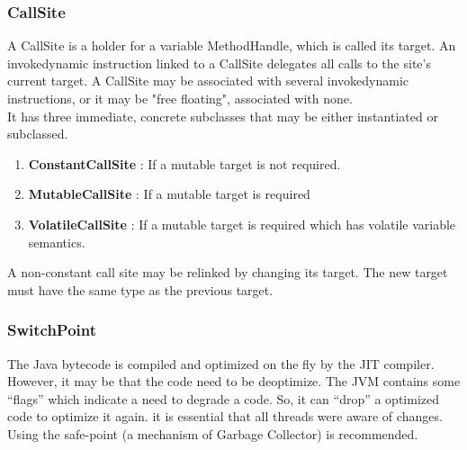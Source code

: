 \documentclass{sigplanconf}
\def \JVM{JVM\xspace}
\begin{document}
      \subsubsection{CallSite}
        A CallSite is a holder for a variable MethodHandle, which is called its target.
        An invokedynamic instruction linked to a CallSite delegates all calls to the site's current target.
        A CallSite may be associated with several invokedynamic instructions,
        or it may be "free floating", associated with none.\\

        It has three immediate, concrete subclasses that may be either instantiated or subclassed.
        \begin{enumerate}
          \item \textbf{ConstantCallSite} : If a mutable target is not required.
          \item \textbf{MutableCallSite}  : If a mutable target is required
          \item \textbf{VolatileCallSite} : If a mutable target is required which has volatile variable semantics.
        \end{enumerate}
        A non-constant call site may be relinked by changing its target.
        The new target must have the same type as the previous target.

      \subsubsection{SwitchPoint}
        The Java bytecode is compiled and optimized on the fly by the JIT compiler.
        However, it may be that the code need to be deoptimize.
        The \JVM contains some ``flags'' which indicate a need to degrade a code.
        So, it can ``drop'' a optimized code to optimize it again.
        it is essential that all threads were aware of changes.
        Using the safe-point (a mechanism of Garbage Collector) is recommended.
\end{document}
